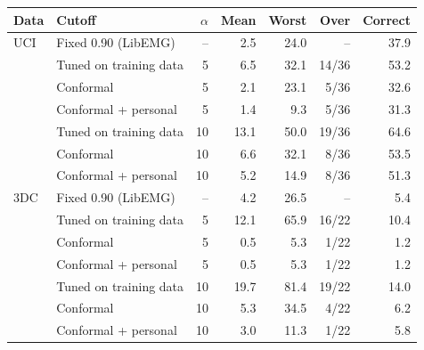 \begin{tabular}{@{}llrrrrr@{}}
\toprule
Data & Cutoff & $\alpha$ & Mean & Worst & Over & Correct \\
\midrule
UCI & Fixed 0.90 (LibEMG) & -- & 2.5 & 24.0 & -- & 37.9 \\
 & Tuned on training data & 5 & 6.5 & 32.1 & 14/36 & 53.2 \\
 & Conformal & 5 & 2.1 & 23.1 & 5/36 & 32.6 \\
 & Conformal + personal & 5 & 1.4 & 9.3 & 5/36 & 31.3 \\
 & Tuned on training data & 10 & 13.1 & 50.0 & 19/36 & 64.6 \\
 & Conformal & 10 & 6.6 & 32.1 & 8/36 & 53.5 \\
 & Conformal + personal & 10 & 5.2 & 14.9 & 8/36 & 51.3 \\
\midrule
3DC & Fixed 0.90 (LibEMG) & -- & 4.2 & 26.5 & -- & 5.4 \\
 & Tuned on training data & 5 & 12.1 & 65.9 & 16/22 & 10.4 \\
 & Conformal & 5 & 0.5 & 5.3 & 1/22 & 1.2 \\
 & Conformal + personal & 5 & 0.5 & 5.3 & 1/22 & 1.2 \\
 & Tuned on training data & 10 & 19.7 & 81.4 & 19/22 & 14.0 \\
 & Conformal & 10 & 5.3 & 34.5 & 4/22 & 6.2 \\
 & Conformal + personal & 10 & 3.0 & 11.3 & 1/22 & 5.8 \\
\bottomrule
\end{tabular}
